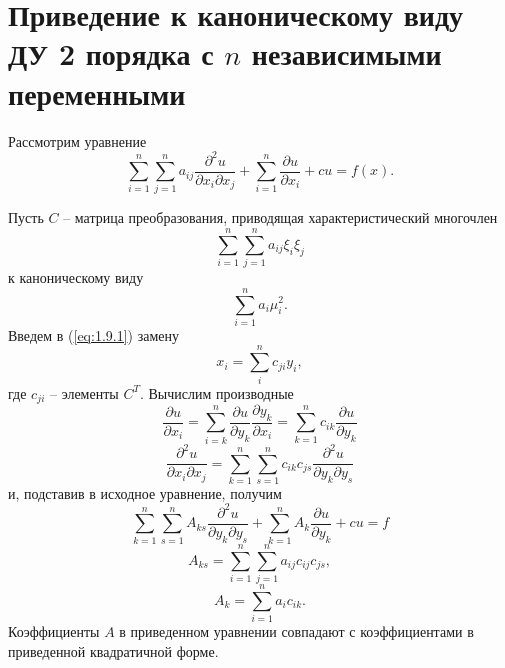 \documentclass[../main.tex]{subfiles}
\begin{document}
\section{Приведение к каноническому виду ДУ 2 порядка с $n$ независимыми переменными}
Рассмотрим уравнение
\begin{equation}  \label{eq:1.9.1}
    \sum_{i=1}^n\sum_{j=1}^n a_{ij} \frac{\partial^2 u}{\partial x_i \partial x_j} + \sum_{i=1}^n \frac{\partial u}{\partial x_i} + cu = f(x).
\end{equation}

Пусть $C$ -- матрица преобразования, приводящая характеристический многочлен $$\sum_{i=1}^n\sum_{j=1}^n a_{ij} \xi_i \xi_j $$ к каноническому виду 
$$\sum_{i=1}^n a_i \mu_i^2.$$
Введем в (\ref{eq:1.9.1}) замену 
$$x_i = \sum_i^n c_{ji}y_i,$$
где $c_{ji}$ -- элементы $C^T$.
Вычислим производные 
$$\frac{\partial u}{\partial x_i} = \sum^n_{i=k}\frac{\partial u}{\partial y_k} \frac{\partial y_k}{\partial x_i} = \sum_{k=1}^n c_{ik} \frac{\partial u}{\partial y_k}$$
$$\frac{\partial^2 u}{\partial x_i \partial x_j} = \sum^n_{k=1}\sum^n_{s=1} c_{ik} c_{js} \frac{\partial^2 u}{\partial y_k \partial y_s}$$
и, подставив в исходное уравнение, получим
\begin{equation}
\boxed{\sum^n_{k=1}\sum^n_{s=1} A_{ks} \frac{\partial^2 u}{\partial y_k \partial y_s} + \sum_{k=1}^n A_k \frac{\partial u}{\partial y_k} + cu = f}
\end{equation}
$$A_{ks} = \sum^n_{i=1}\sum^n_{j=1} a_{ij} c_{ij} c_{js},$$
$$A_k = \sum_{i=1}^n a_i c_{ik}.$$
Коэффициенты $A$ в приведенном уравнении совпадают с коэффициентами в приведенной квадратичной форме.
\end{document}
